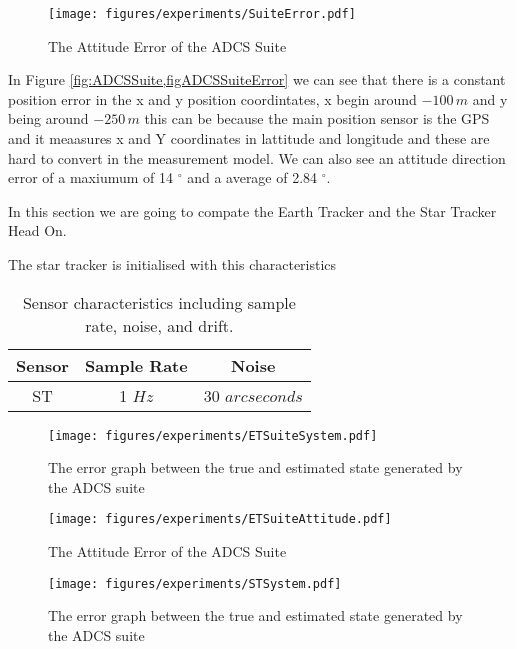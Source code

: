 \begin{figure}[H]
    \centering
    \texttt{[image: figures/experiments/SuiteError.pdf]}
    \caption{The Attitude Error of the ADCS Suite}
    \label{fig:ADCSSuiteError}
\end{figure}

In Figure \ref{fig:ADCSSuite,figADCSSuiteError} we can see that there is a constant position error in the x and y position coordintates, x begin around $-100 \, m$ and y being around $-250 \, m$ this can be because the main position sensor is the GPS and it meaasures x and Y coordinates in lattitude and longitude and these are hard to convert in the measurement model. We can also see an attitude direction error of a maxiumum of 14 $^{\circ}$ and a average of 2.84 $^{\circ}$.


In this section we are going to compate the Earth Tracker and the Star Tracker Head On.

The star tracker is initialised with this characteristics

\begin{table}[H]
\centering
\begin{tabular}{|c|c|c|}
\hline
\textbf{Sensor} & \textbf{Sample Rate} & \textbf{Noise} \\ \hline
ST  &  1 $Hz$ & 30 $arcseconds$ \\ \hline
\end{tabular}
\caption{Sensor characteristics including sample rate, noise, and drift.}
\label{tab:ST_characteristics}
\end{table}


\begin{figure}[H]
    \centering
    \texttt{[image: figures/experiments/ETSuiteSystem.pdf]}
    \caption{The error graph between the true and estimated state generated by the ADCS suite}
    \label{fig:ADCSSuite}
\end{figure}

\begin{figure}[H]
    \centering
    \texttt{[image: figures/experiments/ETSuiteAttitude.pdf]}
    \caption{The Attitude Error of the ADCS Suite}
    \label{fig:ADCSSuiteError}
\end{figure}

\begin{figure}[H]
    \centering
    \texttt{[image: figures/experiments/STSystem.pdf]}
    \caption{The error graph between the true and estimated state generated by the ADCS suite}
    \label{fig:STSystem}
\end{figure}

